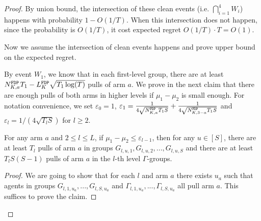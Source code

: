 \begin{proof}
By union bound, the intersection of these clean events (i.e. $\bigcap_{i=1}^4 W_i$) happens with probability $1-O(1/T)$. When this intersection does not happen, since the probability is $O(1/T)$, it cost expected regret $O(1/T) \cdot T = O(1)$. 

Now we assume the intersection of clean events happens and prove upper bound on the expected regret.

By event $W_1$, we know that in each first-level group, there are at least $\fdpN T_1- \GdT \sqrt{T_1\log(T)}$ pulls of arm $a$. We prove in the next claim that there are enough pulls of both arms in higher levels if $\mu_1-\mu_2$ is small enough. For notation convenience, we set $\varepsilon_0 = 1$, $\varepsilon_1 = \frac{1}{4\sqrt{\fdpN T_1S}} + \frac{1}{4\sqrt{\fdpN[3-a] T_1S}}$ and $\varepsilon_l = 1/(4\sqrt{T_lS})$ for $l \geq 2$. 

\begin{claim}
\label{clm:l2_explore}
For any arm $a$ and $2\leq l \leq L$, if $\mu_1 - \mu_2 \leq \varepsilon_{l-1}$, then for any $u \in [S]$, there are at least $T_l$ pulls of arm $a$ in groups $G_{l,u,1},G_{l,u,2}, ... ,G_{l,u,S}$ and there are at least $T_lS(S-1)$ pulls of arm $a$ in the $l$-th level $\Gamma$-groups.
\end{claim}

\begin{proof}
We are going to show that for each $l$ and arm $a$ there exists $u_a$ such that agents in groups $G_{l,1,u_a},...,G_{l,S,u_a}$ and $\Gamma_{l,1,u_a},...,\Gamma_{l,S,u_a}$ all pull arm $a$. This suffices to prove the claim.


\end{proof}
\end{proof}
